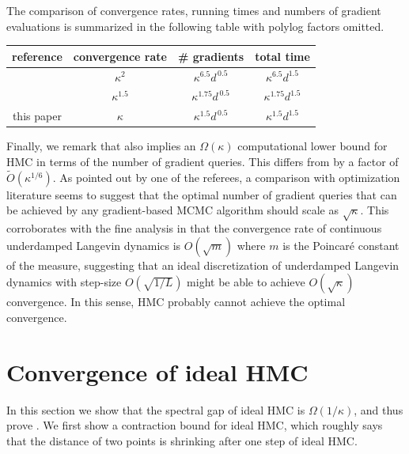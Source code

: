 \documentclass{toc}
\begin{document}
The comparison of convergence rates, running times and numbers of gradient evaluations is summarized in the following table with polylog factors omitted. 

\begin{center}
{\renewcommand{\arraystretch}{1.3}%
	\begin{tabular}{c|c|c|c}
	\hline
	reference & convergence rate & \# gradients & total time\\
	\hline
\cite{MS17} & $\kappa^2$ & $\kappa^{6.5} d^{\,0.5}$  & $\kappa^{6.5} d^{1.5}$ \\
\cite{LSV18} & $\kappa^{1.5}$ & $\kappa^{1.75} d^{\,0.5}$ &  $\kappa^{1.75} d^{1.5}$ \\
this paper & $\kappa$ & $\kappa^{1.5} d^{\,0.5}$ & $\kappa^{1.5} d^{1.5}$\\
\hline
\end{tabular}
	}
\end{center}

Finally, we remark that  also implies an $\Omega(\kappa)$ computational lower bound for HMC in terms of the number of gradient queries. 
This differs from \cite{SL19} by a factor of $\tilde{O}(\kappa^{1/6})$. 
As pointed out by one of the referees, 
a comparison with optimization literature seems to suggest that the optimal number of gradient queries that can be achieved by any gradient-based MCMC algorithm should scale as $\sqrt{\kappa}$. 
This corroborates with the fine analysis in \cite{CLW19} that the convergence rate of continuous underdamped Langevin dynamics is $O(\sqrt{m})$ where $m$ is the Poincar\'{e} constant of the measure, 
suggesting that an ideal discretization of underdamped Langevin dynamics with step-size $O(\sqrt{1/L})$ might be able to achieve $O(\sqrt{\kappa})$ convergence. 
In this sense, HMC probably cannot achieve the optimal convergence.



\section{Convergence of ideal HMC}
In this section we show that the spectral gap of ideal HMC is $\Omega(1/\kappa)$, and thus prove . 
We first show a contraction bound for ideal HMC, which roughly says that the distance of two points is shrinking after one step of ideal HMC. 
\end{document}
